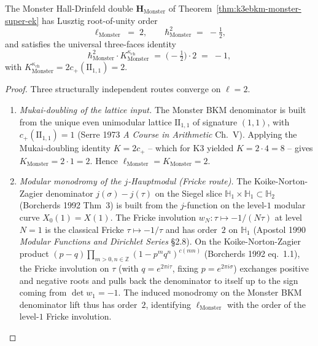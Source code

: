 \begin{theorem}[Monster Lusztig level \texorpdfstring{$\ell_{\mathrm{Monster}} = 2$}{l-Monster = 2}]
\label{thm:k3ebkm-monster-lusztig-level}
The Monster Hall-Drinfeld double $\mathbf H_{\mathrm{Monster}}$ of
Theorem~\ref{thm:k3ebkm-monster-super-ek} has Lusztig root-of-unity
order
\[
 \ell_{\mathrm{Monster}} \;=\; 2,
 \qquad
 \hbar^2_{\mathrm{Monster}} \;=\; -\tfrac{1}{2},
\]
and satisfies the universal three-faces identity
\[
 \hbar^2_{\mathrm{Monster}}\cdot K^{\kappa_{\mathrm{ch}}}_{\mathrm{Monster}}
 \;=\; \bigl(-\tfrac{1}{2}\bigr)\cdot 2 \;=\; -1,
\]
with $K^{\kappa_{\mathrm{ch}}}_{\mathrm{Monster}} = 2c_+(\mathrm{II}_{1,1}) = 2$.
\end{theorem}

\begin{proof}
Three structurally independent routes converge on $\ell = 2$.
\begin{enumerate}[label=\textup{(\roman*)}]
\item \emph{Mukai-doubling of the lattice input.} The Monster BKM
denominator is built from the unique even unimodular lattice
$\mathrm{II}_{1,1}$ of signature $(1,1)$, with $c_+(\mathrm{II}_{1,1}) = 1$
(Serre 1973 \emph{A Course in Arithmetic} Ch.~V). Applying the
Mukai-doubling identity $K = 2c_+$ -- which for K3 yielded
$K = 2\cdot 4 = 8$ -- gives $K_{\mathrm{Monster}} = 2\cdot 1 = 2$.
Hence $\ell_{\mathrm{Monster}} = K_{\mathrm{Monster}} = 2$.

\item \emph{Modular monodromy of the $j$-Hauptmodul (Fricke route).}
The Koike-Norton-Zagier denominator
$j(\sigma)-j(\tau)$ on the Siegel slice
$\mathbb{H}_1\times\mathbb{H}_1\subset\mathbb{H}_2$
(Borcherds 1992 Thm~3) is built from the $j$-function on the
level-$1$ modular curve $X_0(1) = X(1)$. The Fricke involution
$w_N\colon\tau\mapsto -1/(N\tau)$ at level $N = 1$ is the classical
Fricke
$\tau\mapsto -1/\tau$ and has order~$2$ on $\mathbb{H}_1$
(Apostol 1990 \emph{Modular Functions and Dirichlet Series} \S2.8).
On the Koike-Norton-Zagier product
$(p-q)\prod_{m>0,n\in\mathbb{Z}}(1 - p^m q^n)^{c(mn)}$
(Borcherds 1992 eq.~1.1), the Fricke involution on $\tau$
(with $q = e^{2\pi i\tau}$, fixing $p = e^{2\pi i\sigma}$) exchanges
positive and negative roots and pulls back the denominator to itself
up to the sign coming from $\det w_1 = -1$. The induced monodromy
on the Monster BKM denominator lift thus has order~$2$, identifying
$\ell_{\mathrm{Monster}}$ with the order of the level-$1$ Fricke
involution.


\end{enumerate}
\end{proof}

